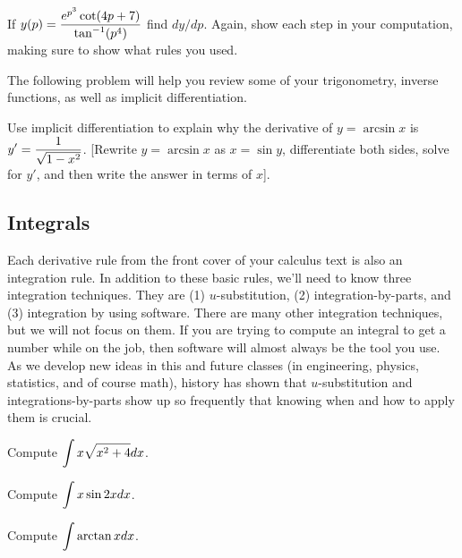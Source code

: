 \begin{problem}
If $y(p) = \displaystyle \frac{e^{p^3}\cot(4p+7)}{\tan^{-1}(p^4)}$ find $dy/dp$. Again, show each step in your computation, making sure to show what rules you used.
\end{problem}

The following problem will help you review some of your trigonometry, inverse functions, as well as implicit differentiation.

\begin{problem}
Use implicit differentiation to explain why the derivative of $y=\arcsin x$ is $\displaystyle y'=\frac{1}{\sqrt{1-x^2}}$.  [Rewrite $y=\arcsin x$ as $x=\sin y$, differentiate both sides, solve for $y'$, and then write the answer in terms of $x$].  
\end{problem}


\subsection{Integrals}
Each derivative rule from the front cover of your calculus text is also an integration rule. In addition to these basic rules, we'll need to know three integration techniques.  They are 
(1) {$u$}-substitution,
(2) integration-by-parts, and
(3) integration by using software. 
There are many other integration techniques, but we will not focus on them. If you are trying to compute an integral to get a number while on the job, then software will almost always be the tool you use.  As we develop new ideas in this and future classes (in engineering, physics, statistics, and of course math), history has shown that $u$-substitution and integrations-by-parts show up so frequently that knowing when and how to apply them is crucial.

\begin{problem}
Compute $\displaystyle\int x\sqrt{x^2+4}dx$.
\end{problem}

\begin{problem}
Compute $\displaystyle\int x\sin 2x dx$.
\end{problem}

\begin{problem}
Compute $\displaystyle \int \arctan x dx$.
\end{problem}

